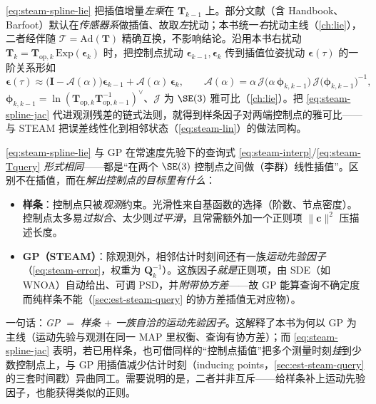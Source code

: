 \begin{note}[扰动取在哪一侧]
\cref{eq:steam-spline-lie} 把插值增量\emph{左乘}在 $\mathbf{T}_{k-1}$ 上。部分文献（含 Handbook\cite{carlone2026handbook}、Barfoot\cite{barfoot2024state}）默认在\emph{传感器系}做插值、故取\emph{左}扰动；本书统一\emph{右}扰动主线（\cref{ch:lie}），二者经伴随 $\boldsymbol{\mathcal{T}}=\mathrm{Ad}(\mathbf{T})$ 精确互换，不影响结论。沿用本书右扰动 $\mathbf{T}_k=\mathbf{T}_{\mathrm{op},k}\,\mathrm{Exp}(\boldsymbol{\epsilon}_k)$ 时，把控制点扰动 $\boldsymbol{\epsilon}_{k-1},\boldsymbol{\epsilon}_k$ 传到插值位姿扰动 $\boldsymbol{\epsilon}(\tau)$ 的一阶关系形如
\begin{equation}
  \boldsymbol{\epsilon}(\tau)\approx\big(\mathbf{I}-\boldsymbol{\mathcal{A}}(\alpha)\big)\boldsymbol{\epsilon}_{k-1}+\boldsymbol{\mathcal{A}}(\alpha)\,\boldsymbol{\epsilon}_k,
  \qquad \boldsymbol{\mathcal{A}}(\alpha)=\alpha\,\boldsymbol{\mathcal{J}}\!\big(\alpha\,\boldsymbol{\phi}_{k,k-1}\big)\,\boldsymbol{\mathcal{J}}\!\big(\boldsymbol{\phi}_{k,k-1}\big)^{-1},
  \label{eq:steam-spline-jac}
\end{equation}
$\boldsymbol{\phi}_{k,k-1}=\ln(\mathbf{T}_{\mathrm{op},k}\mathbf{T}_{\mathrm{op},k-1}^{-1})^\vee$、$\boldsymbol{\mathcal{J}}$ 为 $\SE(3)$ 雅可比（\cref{ch:lie}）。把 \cref{eq:steam-spline-jac} 代进观测残差的链式法则，就得到样条因子对两端控制点的雅可比——与 STEAM 把误差线性化到相邻状态（\cref{eq:steam-lin}）的做法同构。
\end{note}

\begin{insight}
\cref{eq:steam-spline-lie} 与 GP 在常速度先验下的查询式 \cref{eq:steam-interp}/\cref{eq:steam-Tquery} \emph{形式相同}——都是“在两个 $\SE(3)$ 控制点之间做（李群）线性插值”。区别不在插值，而在\emph{解出控制点的目标里有什么}：
\begin{itemize}
  \item \textbf{样条}：控制点只被\emph{观测}约束。光滑性来自基函数的选择（阶数、节点密度）。控制点太多易\emph{过拟合}、太少则\emph{过平滑}，且常需额外加一个正则项 $\|\mathbf{c}\|^2$ 压描述长度\cite{carlone2026handbook}。
  \item \textbf{GP（STEAM）}：除观测外，相邻估计时刻间还有一族\emph{运动先验因子}（\cref{eq:steam-error}，权重为 $\mathbf{Q}_k^{-1}$）。这族因子\emph{就是}正则项，由 SDE（如 WNOA）自动给出、可调 PSD，并\emph{附带协方差}——故 GP 能算查询不确定度而纯样条不能（\cref{sec:est-steam-query} 的协方差插值无对应物）。
\end{itemize}
一句话：\emph{GP $=$ 样条 $+$ 一族自洽的运动先验因子}\cite{carlone2026handbook}。这解释了本书为何以 GP 为主线（运动先验与观测在同一 MAP 里权衡、查询有协方差）；而 \cref{eq:steam-spline-jac} 表明，若已用样条，也可借同样的“控制点插值”把多个测量时刻\emph{挂}到少数控制点上，与 GP 用插值减少估计时刻（inducing points，\cref{sec:est-steam-query} 的三套时间戳）异曲同工。需要说明的是，二者并非互斥——给样条补上运动先验因子，也能获得类似的正则\cite{carlone2026handbook}。
\end{insight}

